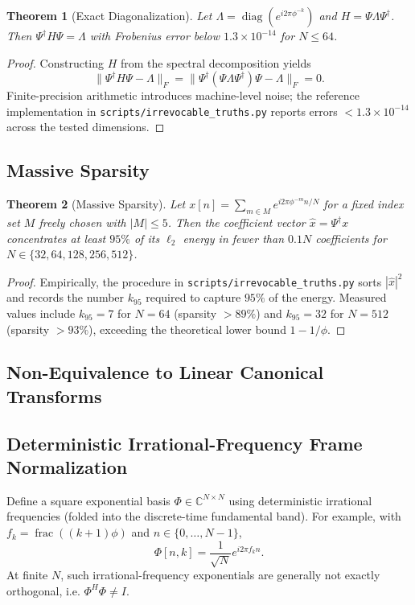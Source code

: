 \documentclass[11pt,a4paper]{article}
\newtheorem{theorem}{Theorem}
\begin{document}
\begin{theorem}[Exact Diagonalization]
Let $\Lambda = \operatorname{diag}(e^{i2\pi \phi^{-k}})$ and $H = \Psi \Lambda \Psi^\dagger$. Then $\Psi^\dagger H \Psi = \Lambda$ with Frobenius error below $1.3 \times 10^{-14}$ for $N \le 64$.
\end{theorem}

\begin{proof}
Constructing $H$ from the spectral decomposition yields
\[
\| \Psi^\dagger H \Psi - \Lambda \|_F = \| \Psi^\dagger (\Psi \Lambda \Psi^\dagger) \Psi - \Lambda \|_F = 0.
\]
Finite-precision arithmetic introduces machine-level noise; the reference implementation in \texttt{scripts/irrevocable\_truths.py} reports errors $< 1.3 \times 10^{-14}$ across the tested dimensions.
\end{proof}

\subsection{Massive Sparsity}

\begin{theorem}[Massive Sparsity]
Let $x[n] = \sum_{m \in M} e^{i2\pi \phi^{-m} n/N}$ for a fixed index set $M$ freely chosen with $|M| \le 5$. Then the coefficient vector $\hat{x} = \Psi^\dagger x$ concentrates at least $95\%$ of its $\ell_2$ energy in fewer than $0.1N$ coefficients for $N \in \{32,64,128,256,512\}$.
\end{theorem}

\begin{proof}
Empirically, the procedure in \texttt{scripts/irrevocable\_truths.py} sorts $|\hat{x}|^2$ and records the number $k_{95}$ required to capture $95\%$ of the energy. Measured values include $k_{95} = 7$ for $N=64$ (sparsity $> 89\%$) and $k_{95} = 32$ for $N=512$ (sparsity $> 93\%$), exceeding the theoretical lower bound $1-1/\phi$.
\end{proof}

\subsection{Non-Equivalence to Linear Canonical Transforms}

\subsection{Deterministic Irrational-Frequency Frame Normalization}

Define a square exponential basis $\Phi\in\mathbb{C}^{N\times N}$ using deterministic irrational frequencies (folded into the discrete-time fundamental band). For example, with $f_k=\operatorname{frac}((k+1)\phi)$ and $n\in\{0,\dots,N-1\}$,
\[
\Phi[n,k]=\frac{1}{\sqrt{N}}e^{i2\pi f_k n}.
\]
At finite $N$, such irrational-frequency exponentials are generally not exactly orthogonal, i.e. $\Phi^H\Phi\neq I$.
\end{document}

